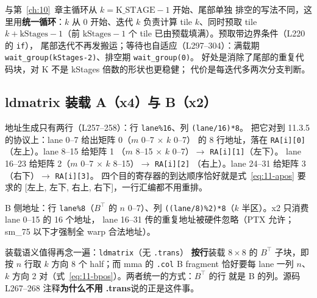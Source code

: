 

与第~\ref{ch:10}~章主循环从 $k{=}\mathrm{K\_STAGE}{-}1$ 开始、尾部单独
排空的写法不同，这里用\textbf{统一循环}：$k$ 从 0 开始、迭代 $k$ 负责计算
tile $k$、同时预取 tile $k+\mathrm{kStages}-1$（前 $\mathrm{kStages}{-}1$
个 tile 已由预载填满）。预取带边界条件（L220 的 \texttt{if}），
尾部迭代不再发搬运；等待也自适应（L297--304）：满载期
\texttt{wait\_\allowbreak{}group\allowbreak{}(k\allowbreak{}Stages-2)}、排空期 \texttt{wait\_\allowbreak{}group\allowbreak{}(0)}。
好处是消除了尾部的重复代码块，对 K 不是 kStages 倍数的形状也更稳健；
代价是每迭代多两次分支判断。

\subsection{ldmatrix 装载 A（x4）与 B（x2）}



地址生成只有两行（L257--258）：行 \texttt{lane\%16}、列 \texttt{(lane/16)*8}。
把它对到 11.3.5 的协议上：lane 0--7 给出矩阵 0（$m$ 0--7 $\times$ $k$ 0--7）
的 8 行地址，落在 \texttt{RA[i][0]}（左上）。lane 8--15 给矩阵 1
（$m$ 8--15 $\times$ $k$ 0--7）$\to$ \texttt{RA[i][1]}（左下）。
lane 16--23 给矩阵 2（$m$ 0--7 $\times$ $k$ 8--15）$\to$ \texttt{RA[i][2]}
（右上）。lane 24--31 给矩阵 3（右下）$\to$ \texttt{RA[i][3]}。
四个目的寄存器的到达顺序恰好就是式~\ref{eq:11-apos} 要求的
[左上, 左下, 右上, 右下]，一行汇编都不用重排。



B 侧地址：行 \texttt{lane\%8}（$B^{\top}$ 的 $n$ 0--7）、列
\texttt{\allowbreak{}(\allowbreak{}(lane/\allowbreak{}8)\%2)*8}（$k$ 半区）。x2 只消费 lane 0--15 的 16 个地址，
lane 16--31 传的重复地址被硬件忽略（PTX 允许；sm\_75 以下才强制全 warp
合法地址）。

装载语义值得再念一遍：\texttt{ldmatrix}（无 \texttt{.trans}）
\textbf{按行}装载 $8\times8$ 的 $B^{\top}$ 子块，即按 $n$ 行取 $k$ 方向
8 个 half；而 mma 的 \texttt{.col} B fragment 恰好要每 lane 一列 $n$、
$k$ 方向 2 对（式~\ref{eq:11-bpos}）。两者统一的方式：$B^{\top}$ 的行
就是 B 的列。源码 L267--268 注释\textbf{为什么不用 .trans}说的正是这件事。

